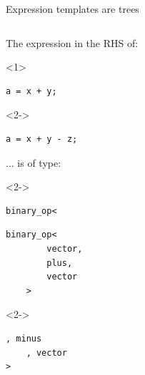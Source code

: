 \documentclass[@BEAMER_OPTIONS@]{beamer}
\begin{document}
\begin{frame}[fragile]{Expression templates are trees}
    \begin{columns}
        \begin{column}{0.4\textwidth}
            \begin{exampleblock}{The expression in the RHS of:}
                \begin{onlyenv}<1>
                    \begin{lstlisting}
a = x + y;
                    \end{lstlisting}
                \end{onlyenv}
                \begin{onlyenv}<2->
                    \begin{lstlisting}
a = x + y - z;
                    \end{lstlisting}
                \end{onlyenv}
            \end{exampleblock}
            \begin{exampleblock}{... is of type:}
                \begin{uncoverenv}<2->
                    \begin{lstlisting}[numbers=none]
binary_op<
                    \end{lstlisting}
                \end{uncoverenv}
                \begin{lstlisting}[numbers=none]
    binary_op<
        vector,
        plus,
        vector
    >
                \end{lstlisting}
                \begin{uncoverenv}<2->
                    \begin{lstlisting}[numbers=none]
    , minus
    , vector
>
                    \end{lstlisting}
                \end{uncoverenv}
            \end{exampleblock}
        \end{column}
        \begin{column}{0.55\textwidth}
            \begin{figure}
\end{figure}
\end{column}
\end{columns}
\end{frame}
\end{document}
